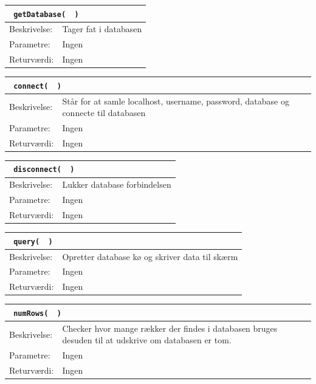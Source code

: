 \begin{table}[H]
\begin{tabular}{l p{12.5cm}}
\multicolumn{2}{l}{\texttt{\textcolor{blue}{} getDatabase( \textcolor{blue}{} )}} \\
\hline
Beskrivelse: & Tager fat i databasen\\
Parametre: & Ingen\\
Returværdi: & Ingen\\
\end{tabular}
\end{table}

\begin{table}[H]
\begin{tabular}{l p{12.5cm}}
\multicolumn{2}{l}{\texttt{\textcolor{blue}{} connect( \textcolor{blue}{} )}} \\
\hline
Beskrivelse: & Står for at samle localhost, username, password, database og connecte til databasen\\
Parametre: & Ingen\\
Returværdi: & Ingen\\
\end{tabular}
\end{table}

\begin{table}[H]
\begin{tabular}{l p{12.5cm}}
\multicolumn{2}{l}{\texttt{\textcolor{blue}{} disconnect( \textcolor{blue}{} )}} \\
\hline
Beskrivelse: & Lukker database forbindelsen\\
Parametre: & Ingen\\
Returværdi: & Ingen\\
\end{tabular}
\end{table}

\begin{table}[H]
\begin{tabular}{l p{12.5cm}}
\multicolumn{2}{l}{\texttt{\textcolor{blue}{} query( \textcolor{blue}{} )}} \\
\hline
Beskrivelse: & Opretter database kø og skriver data til skærm\\
Parametre: & Ingen\\
Returværdi: & Ingen\\
\end{tabular}
\end{table}

\begin{table}[H]
\begin{tabular}{l p{12.5cm}}
\multicolumn{2}{l}{\texttt{\textcolor{blue}{} numRows( \textcolor{blue}{} )}} \\
\hline
Beskrivelse: & Checker hvor mange rækker der findes i databasen bruges desuden til at udskrive om databasen er tom.\\
Parametre: & Ingen\\
Returværdi: & Ingen\\
\end{tabular}
\end{table}

